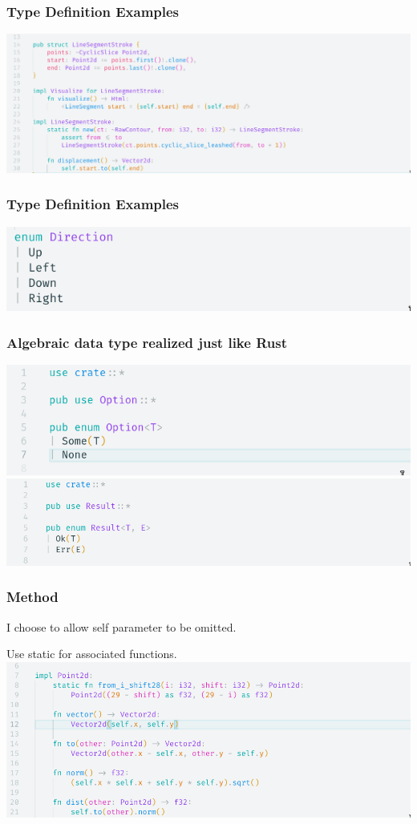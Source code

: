 \documentclass{beamer}   	%
\theoremstyle{definition}
\begin{document}
\begin{frame}
\frametitle{Type Definition Examples}
\includegraphics[width=\linewidth]{snapshots/husky_struct_definition.png}
\end{frame}

\begin{frame}
\frametitle{Type Definition Examples}
\includegraphics[width=\linewidth]{snapshots/husky_enum_definition.png}
\end{frame}


\begin{frame}
\frametitle{Algebraic data type realized just like Rust}
\includegraphics[width=\linewidth]{snapshots/husky_option_definition.png}
\includegraphics[width=\linewidth]{snapshots/husky_result_definition.png}
\end{frame}

\begin{frame}
\frametitle{Method}
I choose to allow self parameter to be omitted.

Use static for associated functions.
\includegraphics[width=\linewidth]{snapshots/husky_method.png}
\end{frame}
\end{document}
